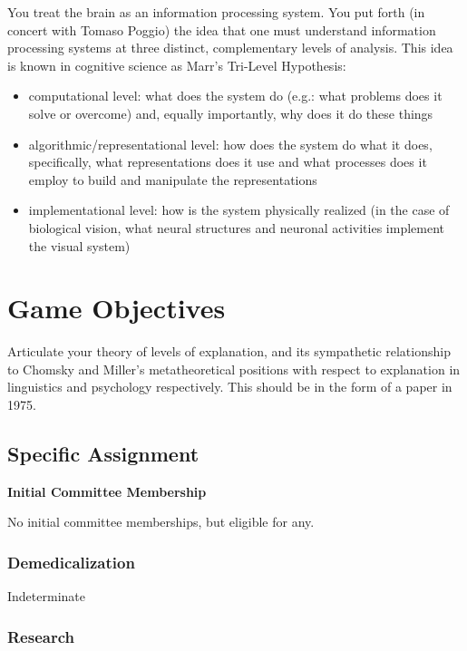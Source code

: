 \begin{refsection}
You treat the brain as an information processing system. You put forth (in concert with Tomaso Poggio) the idea that one must understand information processing systems at three distinct, complementary levels of analysis. This idea is known in cognitive science as Marr's Tri-Level Hypothesis:

\begin{itemize}
\item computational level: what does the system do (e.g.: what problems does it solve or overcome) and, equally importantly, why does it do these things

\item algorithmic\slash representational level: how does the system do what it does, specifically, what representations does it use and what processes does it employ to build and manipulate the representations

\item implementational level: how is the system physically realized (in the case of biological vision, what neural structures and neuronal activities implement the visual system)

\end{itemize}

\section{Game Objectives}
\label{gameobjectives}

Articulate your theory of levels of explanation, and its sympathetic relationship to Chomsky and Miller's metatheoretical positions with respect to explanation in linguistics and psychology respectively. This should be in the form of a paper in 1975.

\subsection{Specific Assignment}
\label{specificassignment}

\textbf{Initial Committee Membership}

No initial committee memberships, but eligible for any.

\subsubsection{Demedicalization}
\label{demedicalization}

Indeterminate

\subsubsection{Research}
\label{research}


\end{refsection}
